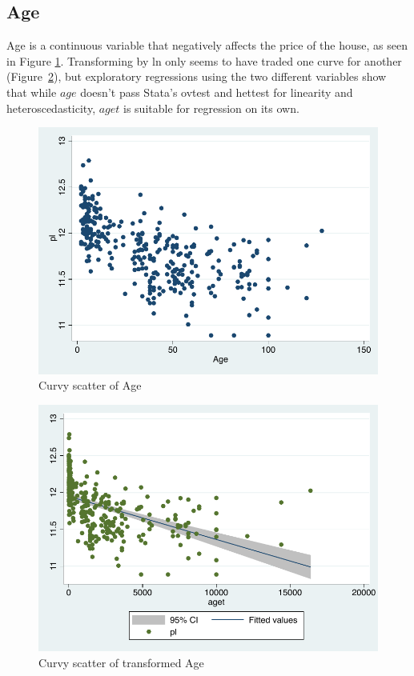 \documentclass[twocolumn,11pt]{article}
\begin{document}
\subsection*{Age}
Age is a continuous variable that negatively affects the price of the house, as seen in Figure \ref{fig:ageScatter}.
Transforming by ln only seems to have traded one curve for another (Figure~\ref{fig:agetScatter}),
but exploratory regressions using the two different variables show that while $age$
doesn't pass Stata's ovtest and hettest for linearity and heteroscedasticity,
$aget$ is suitable for regression on its own.
\begin{figure}[H]
\centering
  \includegraphics[width=.9\linewidth]{figures/age-scatter.pdf}
  \caption{Curvy scatter of Age}
  \label{fig:ageScatter}
\end{figure}
\begin{figure}[H]
\centering
  \includegraphics[width=.9\linewidth]{figures/aget-scatter.pdf}
  \caption{Curvy scatter of transformed Age}
  \label{fig:agetScatter}
\end{figure}
\end{document}
